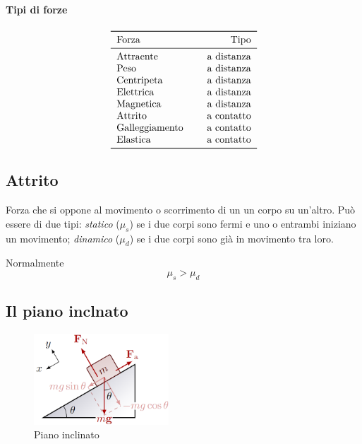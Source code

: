 \paragraph{Tipi di forze} 
\paragraph{}
\begin{align*}
\begin{tabular}{ l c r }
\toprule
Forza       &    \qquad    &   Tipo\\
\midrule
Attraente   &       \qquad    &   a distanza\\
Peso        &       \qquad    &   a distanza\\
Centripeta   &      \qquad     &   a distanza\\
Elettrica        &       \qquad    &   a distanza\\
Magnetica        &       \qquad    &   a distanza\\
Attrito        &       \qquad    &   a contatto\\
Galleggiamento &       \qquad    &   a contatto\\
Elastica &       \qquad    &   a contatto\\
\bottomrule
\end{tabular}
\end{align*}

\newpage
\subsection{Attrito}
Forza che si oppone al movimento o scorrimento di un un corpo su un'altro. Può essere di due tipi: \textit{statico} ($\mu_s$) se i due corpi sono fermi e uno o entrambi iniziano un movimento; \textit{dinamico} ($\mu_d$) se i due corpi sono già in movimento tra loro.

Normalmente
\begin{equation*}
  \mu_s > \mu_d
\end{equation*}

\subsection{Il piano inclnato}

\begin{figure}[H]
\centering
\includegraphics[width=0.45\textwidth]{image/attrito3.png}
\caption{Piano inclinato}
\label{img:pianoIncl}
\end{figure}


